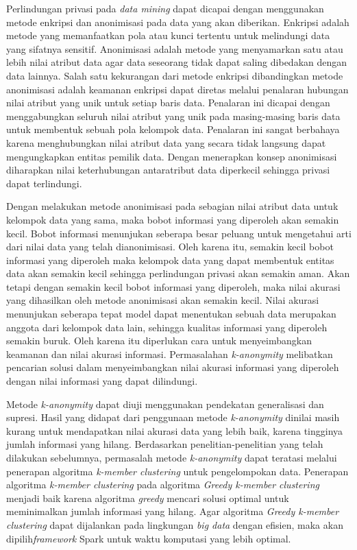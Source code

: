 Perlindungan privasi pada {\it data mining} dapat dicapai dengan menggunakan metode enkripsi dan anonimisasi pada data yang akan diberikan. Enkripsi adalah metode yang memanfaatkan pola atau kunci tertentu untuk melindungi data yang sifatnya sensitif. Anonimisasi adalah metode yang menyamarkan satu atau lebih nilai atribut data agar data seseorang tidak dapat saling dibedakan dengan data lainnya. Salah satu kekurangan dari metode enkripsi dibandingkan metode anonimisasi adalah keamanan enkripsi dapat diretas melalui penalaran hubungan nilai atribut yang unik untuk setiap baris data. Penalaran ini dicapai dengan menggabungkan seluruh nilai atribut yang unik pada masing-masing baris data untuk membentuk sebuah pola kelompok data. Penalaran ini sangat berbahaya karena menghubungkan nilai atribut data yang secara tidak langsung dapat mengungkapkan entitas pemilik data. Dengan menerapkan konsep  anonimisasi diharapkan nilai keterhubungan antaratribut data diperkecil sehingga privasi dapat terlindungi.

\noindent Dengan melakukan metode anonimisasi pada sebagian nilai atribut data untuk kelompok data yang sama, maka bobot informasi yang diperoleh akan semakin kecil. Bobot informasi menunjukan seberapa besar peluang untuk mengetahui arti dari nilai data yang telah dianonimisasi. Oleh karena itu, semakin kecil bobot informasi yang diperoleh maka kelompok data yang dapat membentuk entitas data akan semakin kecil sehingga perlindungan privasi akan semakin aman. Akan tetapi dengan semakin kecil bobot informasi yang diperoleh, maka nilai akurasi yang dihasilkan oleh metode anonimisasi akan semakin kecil. Nilai akurasi menunjukan seberapa tepat model dapat menentukan sebuah data merupakan anggota dari kelompok data lain, sehingga kualitas informasi yang diperoleh semakin buruk. Oleh karena itu diperlukan cara untuk menyeimbangkan keamanan dan nilai akurasi informasi. Permasalahan {\it k-anonymity} melibatkan pencarian solusi dalam menyeimbangkan nilai akurasi informasi yang diperoleh dengan nilai informasi yang dapat dilindungi. 

Metode {\it k-anonymity} dapat diuji menggunakan pendekatan generalisasi dan supresi. Hasil yang didapat dari penggunaan metode {\it k-anonymity} dinilai masih kurang untuk mendapatkan nilai akurasi data yang lebih baik, karena tingginya jumlah informasi yang hilang. Berdasarkan penelitian-penelitian yang telah dilakukan sebelumnya, permasalah metode {\it k-anonymity} dapat teratasi melalui penerapan algoritma {\it k-member clustering} untuk pengelompokan data. Penerapan algoritma {\it k-member clustering} pada algoritma {\it Greedy k-member clustering} menjadi baik karena algoritma {\it greedy} mencari solusi optimal untuk meminimalkan jumlah informasi yang hilang. Agar algoritma \textit{Greedy k-member clustering} dapat dijalankan pada lingkungan {\it big data} dengan efisien, maka  akan dipilih\textit{framework} Spark untuk waktu komputasi yang lebih optimal.

